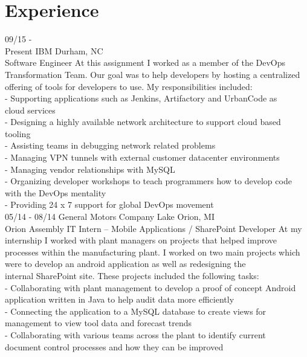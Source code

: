 \documentclass[]{friggeri-cv}
\begin{document}
\section{Experience}
\begin{entrylist}
  \entry
    {09/15 - \\Present}
    {IBM \hfill \hfill Durham, NC}
    {\\Software Engineer}
    {At this assignment I worked as a member of the DevOps Transformation Team. Our goal was to help developers by hosting a centralized offering of tools for developers to use. My responsibilities included:\\
    - Supporting applications such as Jenkins, Artifactory and UrbanCode as \\cloud services\\
    - Designing a highly available network architecture to support cloud based \\tooling\\
    - Assisting teams in debugging network related problems\\
    - Managing VPN tunnels with external customer datacenter environments\\
    - Managing vendor relationships with MySQL\\
    - Organizing developer workshops to teach programmers how to develop code \\with the DevOps mentality\\
    - Providing 24 x 7 support for global DevOps movement\\}
  \entry
    {05/14 - 08/14}
    {General Motors Company \hfill \hfill Lake Orion, MI}
    {\\Orion Assembly IT Intern – Mobile Applications / SharePoint Developer}
    {At my internship I worked with plant managers on projects that helped improve processes within the manufacturing plant. I worked on two main projects which were to develop an android application as well as redesigning the \\internal SharePoint site. These projects included the following tasks:\\
    - Collaborating with plant management to develop a proof of concept Android application written in Java to help audit data more efficiently\\
    - Connecting the application to a MySQL database to create views for management to view tool data and forecast trends\\
    - Collaborating with various teams across the plant to identify current \\document control processes and how they can be improved\\
}
\end{entrylist}
\end{document}
